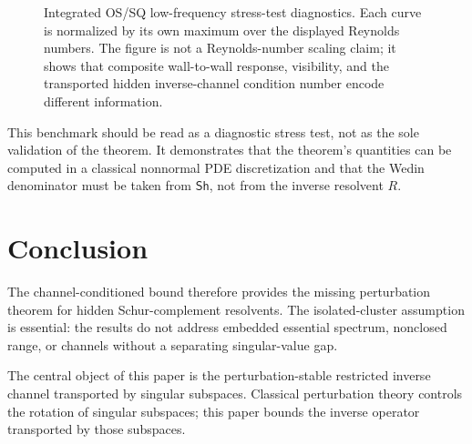 \documentclass[review]{siamart220329}
\theoremstyle{definition}
\theoremstyle{remark}
\newcommand{\Sh}{\mathsf{Sh}}
\newcommand{\norm}[1]{\left\lVert #1\right\rVert}
\begin{document}
\begin{figure}[ht]
\centering
{}
\caption{Integrated OS/SQ low-frequency stress-test diagnostics. Each curve is normalized by its own maximum over the displayed Reynolds numbers. The figure is not a Reynolds-number scaling claim; it shows that composite wall-to-wall response, visibility, and the transported hidden inverse-channel condition number encode different information.}
\label{fig:orr-sommerfeld-re}
\end{figure}

This benchmark should be read as a diagnostic stress test, not as the sole
validation of the theorem. It demonstrates that the theorem's quantities can be
computed in a classical nonnormal PDE discretization and that the Wedin
denominator must be taken from $\Sh$, not from the inverse resolvent $R$.


\section{Conclusion}
The channel-conditioned bound therefore provides the missing perturbation theorem for hidden Schur-complement resolvents.
The isolated-cluster assumption is essential: the results do not address embedded essential spectrum, nonclosed range, or channels without a separating singular-value gap.

The central object of this paper is the perturbation-stable restricted inverse channel transported by singular subspaces. Classical perturbation theory controls the rotation of singular subspaces; this paper bounds the inverse operator transported by those subspaces.
\end{document}
